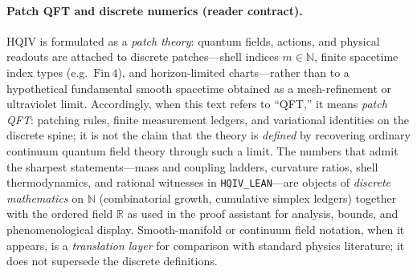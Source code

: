 
\paragraph{Patch QFT and discrete numerics (reader contract).}
HQIV is formulated as a \emph{patch theory}: quantum fields, actions, and physical readouts are attached to discrete patches---shell indices $m\in\mathbb{N}$, finite spacetime index types (e.g.\ $\mathrm{Fin}\,4$), and horizon-limited charts---rather than to a hypothetical fundamental smooth spacetime obtained as a mesh-refinement or ultraviolet limit.
Accordingly, when this text refers to ``QFT,'' it means \emph{patch QFT}: patching rules, finite measurement ledgers, and variational identities on the discrete spine; it is not the claim that the theory is \emph{defined} by recovering ordinary continuum quantum field theory through such a limit.
The numbers that admit the sharpest statements---mass and coupling ladders, curvature ratios, shell thermodynamics, and rational witnesses in \texttt{HQIV\_LEAN}---are objects of \emph{discrete mathematics} on $\mathbb{N}$ (combinatorial growth, cumulative simplex ledgers) together with the ordered field $\mathbb{R}$ as used in the proof assistant for analysis, bounds, and phenomenological display.
Smooth-manifold or continuum field notation, when it appears, is a \emph{translation layer} for comparison with standard physics literature; it does not supersede the discrete definitions.
